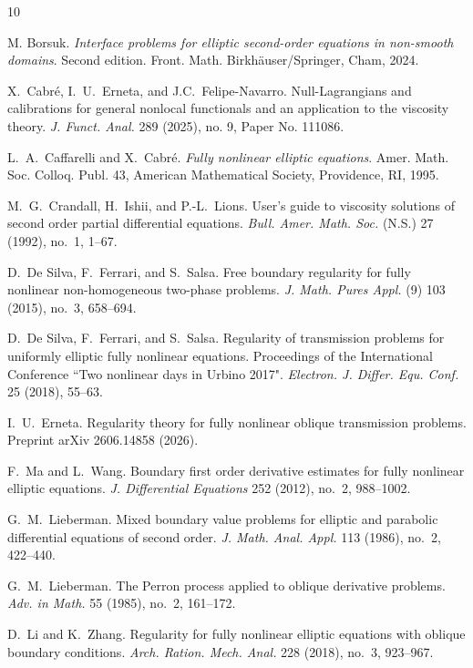 \documentclass[letter,11pt]{amsart}
\theoremstyle{definition}
\numberwithin{equation}{section}
\begin{document}
\begin{thebibliography}{10}

M. Borsuk.
\textit{Interface problems for elliptic second-order equations in non-smooth domains}.
Second edition. Front. Math. Birkh\"{a}user/Springer, Cham, 2024.

X.~Cabr\'{e}, I.~U.~Erneta, and J.C.~Felipe-Navarro.
Null-Lagrangians and calibrations for general nonlocal functionals and an application to the viscosity theory.
\textit{J. Funct. Anal.} 289 (2025), no. 9, Paper No. 111086.

L.~A.~Caffarelli and X.~Cabr\'{e}.
\emph{Fully nonlinear elliptic equations}.
Amer. Math. Soc. Colloq. Publ. 43, American Mathematical Society, Providence, RI, 1995.

M.~G.~Crandall, H.~Ishii, and P.-L.~Lions.
User's guide to viscosity solutions of second order partial differential equations.
\textit{Bull. Amer. Math. Soc.} (N.S.) 27 (1992), no.~1, 1--67.

D.~De Silva, F.~Ferrari, and S.~Salsa.
Free boundary regularity for fully nonlinear non-homogeneous two-phase problems.
\textit{J. Math. Pures Appl.} (9) 103 (2015), no.~3, 658--694.

D.~De Silva, F.~Ferrari, and S.~Salsa.
Regularity of transmission problems for uniformly elliptic fully nonlinear equations.
Proceedings of the International Conference ``Two nonlinear days in Urbino 2017".
\textit{Electron. J. Differ. Equ. Conf.} 25 (2018), 55--63.

I.~U.~Erneta.
Regularity theory for fully nonlinear oblique transmission problems.
Preprint arXiv 2606.14858 (2026).

F.~Ma and L.~Wang.
Boundary first order derivative estimates for fully nonlinear elliptic equations.
\textit{J. Differential Equations} 252 (2012), no.~2, 988--1002.

G.~M.~Lieberman.
Mixed boundary value problems for elliptic and parabolic differential equations of second order.
\textit{J. Math. Anal. Appl.} 113 (1986), no.~2, 422--440.

G.~M.~Lieberman.
The Perron process applied to oblique derivative problems.
\textit{Adv. in Math.} 55 (1985), no.~2, 161--172.

D.~Li and K.~Zhang.
Regularity for fully nonlinear elliptic equations with oblique boundary conditions.
\textit{Arch. Ration. Mech. Anal.} 228 (2018), no.~3, 923--967.


\end{thebibliography}
\end{document}
